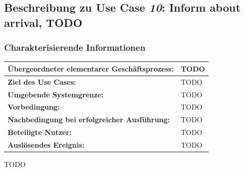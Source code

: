 			\pagebreak
	
		\subsection{Beschreibung zu Use Case \emph{10}: Inform about arrival, TODO}
			
			\subsubsection*{Charakterisierende Informationen}
			
			\begin{table}[H]
				\centering
				\begin{tabularx}{\textwidth}{|p{5cm}|X|}
					\hline
					\textbf{Übergeordneter elementarer Geschäftsprozess:} & TODO  \\ \hline
					\textbf{Ziel des Use Cases:} & TODO \\ \hline
					\textbf{Umgebende Systemgrenze:} & TODO \\ \hline
					\textbf{Vorbedingung:} & TODO \\ \hline
					\textbf{Nachbedingung bei erfolgreicher Ausführung:} & TODO \\ \hline
					\textbf{Beteiligte Nutzer:} & TODO \\ \hline
					\textbf{Auslösendes Ereignis:} & TODO \\
					\hline
				\end{tabularx}
			\end{table}
			
			TODO
			
			
			\pagebreak